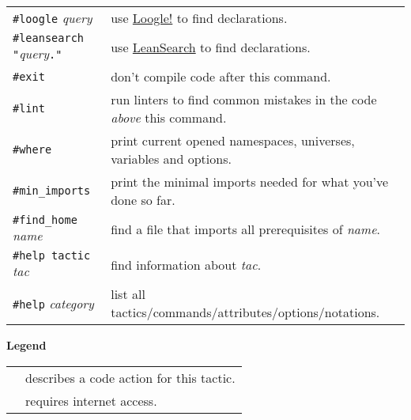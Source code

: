 \documentclass[a4paper]{article}
\newcommand{\lean}[1]{{\tt #1}}
\newcommand{\tactic}[1][]{\textit{tac#1}\xspace} %
\newcommand{\name}{\textit{name}\xspace}
\newcommand{\light}{\faLightbulbO\xspace}
\newcommand{\internet}{\faGlobe\xspace}
\begin{document}
\begin{longtable}{@{}lp{113mm}@{}}
\lean{\#loogle} \textit{query} & \internet use \href{https://loogle.lean-lang.org/}{Loogle!} to find declarations. \\
\lean{\#leansearch "}\textit{query}\lean{."} & \internet use \href{https://leansearch.net}{LeanSearch} to find declarations. \\
\lean{\#exit} & don't compile code after this command.\\
\lean{\#lint} & run linters to find common mistakes in the code \emph{above} this command.\\
\lean{\#where} & print current opened namespaces, universes, variables and options.\\
\lean{\#min\_imports} & print the minimal imports needed for what you've done so far.\\
\lean{\#find\_home} \name & find a file that imports all prerequisites of \name.\\
\lean{\#help tactic} \tactic & find information about \tactic.\\
\lean{\#help} \textit{category} & list all tactics/commands/attributes/options/notations.\\
\end{longtable}

\textbf{Legend}\\
\begin{tabular}{ll}
\light & describes a code action for this tactic.\\
\internet & requires internet access.\\
\end{tabular}
\bigskip

\end{document}
